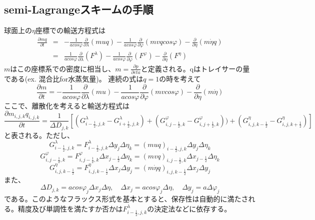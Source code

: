 \documentclass{jsbook}
\begin{document}
\subsection{semi-Lagrangeスキームの手順}
球面上の$\eta$座標での輸送方程式は
\begin{eqnarray*}
  \frac{\partial mq}{\partial t} &=& - \frac{1}{a cos \varphi} \frac{\partial}{\partial \lambda}(muq)- \frac{1}{a cos \varphi} \frac{\partial}{\partial \varphi}(mvq cos \varphi)- \frac{\partial}{\partial \eta} (m \dot{\eta} q)\\
  &=& \frac{1}{a cos \varphi} \frac{\partial}{\partial \lambda}(F^{\lambda})- \frac{1}{a cos \varphi} \frac{\partial}{\partial \varphi}(F^{\varphi})- \frac{\partial}{\partial \eta} (F^{\eta})
\end{eqnarray*}
$m$はこの座標系での密度に相当し、$m=\frac{\partial p}{\partial eta}$と定義される。qはトレイサーの量である(ex. 混合比for水蒸気量)。
連続の式は$q=1$の時を考えて
\begin{equation}
  \frac{\partial m}{\partial t} = - \frac{1}{a cos \varphi} \frac{\partial}{\partial \lambda}(mu)- \frac{1}{a cos \varphi} \frac{\partial}{\partial \varphi}(mv cos \varphi)- \frac{\partial}{\partial \eta} (m \dot{\eta})  
\end{equation}
ここで、離散化を考えると輸送方程式は
\begin{equation}
  \frac{\partial m_{i,j,k} q_{i,j,k}}{\partial t}=\frac{1}{\Delta D_{j,k}}[(G^{\lambda}_{i-\frac{1}{2},j,k}-G^{\lambda}_{i+\frac{1}{2},j,k})+(G^{\varphi}_{i,j-\frac{1}{2},k}-G^{\varphi}_{i,j+\frac{1}{2},k}))+(G^{\eta}_{i,j,k-\frac{1}{2}}-G^{\eta}_{i,j,k+\frac{1}{2}})]
\end{equation}
と表される。ただし、
\begin{equation}
  G^{\lambda}_{i-\frac{1}{2},j,k}=F^{\lambda}_{i-\frac{1}{2},j,k} \Delta y_{j} \Delta \eta_{k}=(muq)_{i-\frac{1}{2},j,k} \Delta y_{j} \Delta \eta_{k}
\end{equation}
\begin{equation}
  G^{\varphi}_{i,j-\frac{1}{2},k}=F^{\varphi}_{i,j-\frac{1}{2},k} \Delta x_{j-\frac{1}{2}} \Delta \eta_{k}=(mvq)_{i,j-\frac{1}{2},k} \Delta x_{j-\frac{1}{2}} \Delta \eta_{k}
\end{equation}
\begin{equation}
  G^{\eta}_{i,j,k-\frac{1}{2}}=F^{\eta}_{i,j,k-\frac{1}{2}} \Delta x_{j} \Delta y_{j}=(m \dot{\eta} q)_{i,j,k-\frac{1}{2}} \Delta x_{j} \Delta y_{j}
\end{equation}
また、
\begin{equation}
  \Delta D_{j,k}=a cos \varphi_{j} \Delta x_{j} \Delta \eta,\quad \Delta x_{j}=a cos \varphi_{j} \Delta \eta,\quad \Delta y_{j}=a \Delta \varphi_{j}
\end{equation}
である。このようなフラックス形式を基本とすると、保存性は自動的に満たされる。精度及び単調性を満たすか否かは$F^{\lambda}_{i-\frac{1}{2},j,k}$の決定法などに依存する。
\end{document}
